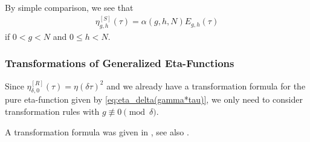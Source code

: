 \documentclass{article}
\begin{document}
By simple comparison, we see that
\begin{gather}
  \eta_{g,h}^{[S]}(\tau)
  =
  \alpha(g,h,N) E_{g,h}(\tau)
  \label{eq:eta_g-h-Schoneberg-Yang}
\end{gather}
if $0<g<N$ and $0\le h<N$.


\subsubsection{Transformations of Generalized Eta-Functions}

Since $\eta_{\delta,0}^{[R]}(\tau) = \eta(\delta\tau)^2$ and we already have
a transformation formula for the pure eta-function given by
\eqref{eq:eta_delta(gamma*tau)}, we only need to consider
transformation rules with $g \not\equiv 0 \pmod{\delta}$.

A transformation formula was given in
\cite[Chp.~VIII]{Schoeneberg:EllipticModularFunctions:1974}, see
also \cite[p.~673]{Yang:GeneralizedDedekindEtaFunctions:2004}.
\end{document}
